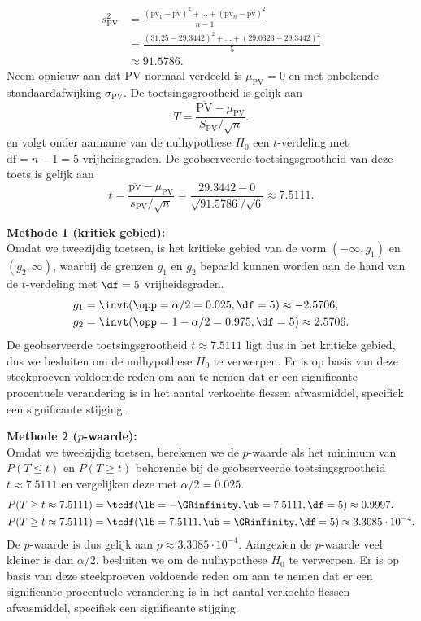 {    \begin{align*}
    s_{\text{PV}}^2    &= \frac{(\text{pv}_1-\overline{\text{pv}})^2 + \ldots + (\text{pv}_n-\overline{\text{pv}})^2}{n-1} \\
                &= \frac{(31.25-29.3442)^2 + \ldots + (29.0323-29.3442)^2}{5} \\
                &\approx 91.5786.
    \end{align*}  
    Neem opnieuw aan dat $\text{PV}$ normaal verdeeld is $\mu_{\text{PV}} = 0$ en met onbekende standaardafwijking $\sigma_{\text{PV}}$.  
    De toetsingsgrootheid is gelijk aan
    \[
        T = \frac{\overline{\text{PV}} - \mu_{\text{PV}}}{S_{\text{PV}} / \sqrt{n}}.
    \]
    en volgt onder aanname van de nulhypothese $H_0$ een $t$-verdeling met $\text{df}=n-1 = 5$ vrijheidsgraden. 
    De geobserveerde toetsingsgrootheid van deze toets is gelijk aan
    \[
        t = \frac{\overline{\text{pv}} - \mu_{\text{PV}}}{s_{\text{PV}} / \sqrt{n}} = \frac{29.3442 - 0}{\sqrt{91.5786} / \sqrt{6}} \approx 7.5111.
    \]

    {\noindent\bfseries Methode 1 (kritiek gebied):}\\    
    Omdat we tweezijdig toetsen, is het kritieke gebied van de vorm $(-\infty, g_1)$ en $(g_2, \infty)$, waarbij de grenzen $g_1$ en $g_2$ bepaald 
    kunnen worden aan de hand van de $t$-verdeling met $\df=5$ vrijheidsgraden.
    \begin{align*}
        g_1 &= \invt(\opp=\alpha/2 = 0.025, \df=5) \approx -2.5706, \\
        g_2 &= \invt(\opp=1-\alpha/2 = 0.975, \df=5) \approx 2.5706.
    \end{align*}
    De geobserveerde toetsingsgrootheid $t \approx 7.5111$ ligt dus in het kritieke gebied, dus we besluiten om de nulhypothese $H_0$ te verwerpen.
    Er is op basis van deze steekproeven voldoende reden om aan te nemen dat er een significante procentuele verandering is in het aantal verkochte flessen afwasmiddel, specifiek een significante stijging.\\
    \medskip

    {\noindent\bfseries Methode 2 ($p$-waarde):}\\
    Omdat we tweezijdig toetsen, berekenen we de $p$-waarde als het minimum van $P(T \leq t)$ en $P(T \geq t)$ behorende bij de geobserveerde toetsingsgrootheid 
    $t \approx 7.5111$ en vergelijken deze met $\alpha/2 = 0.025$.
    \begin{align*}
        P(T \geq t \approx 7.5111) &= \tcdf(\lb=-\GRinfinity, \ub=7.5111, \df=5) \approx 0.9997.\\
        P(T \geq t \approx 7.5111) &= \tcdf(\lb=7.5111, \ub=\GRinfinity, \df=5) \approx 3.3085 \cdot 10^{-4}.
    \end{align*}
    De $p$-waarde is dus gelijk aan $p \approx 3.3085 \cdot 10^{-4}$.
    Aangezien de $p$-waarde veel kleiner is dan $\alpha/2$, besluiten we om de nulhypothese $H_0$ te verwerpen.
    Er is op basis van deze steekproeven voldoende reden om aan te nemen dat er een significante procentuele verandering is in het aantal verkochte flessen afwasmiddel, specifiek een significante stijging.
}